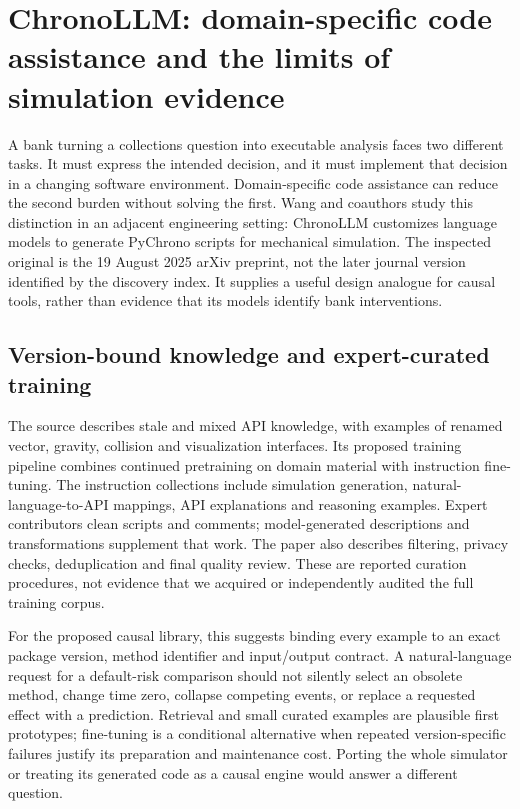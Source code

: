 \section{ChronoLLM: domain-specific code assistance and the limits of simulation evidence}
\label{sec:exec24-chronollm}
A bank turning a collections question into executable analysis faces two
different tasks. It must express the intended decision, and it must implement
that decision in a changing software environment. Domain-specific code
assistance can reduce the second burden without solving the first. Wang and
coauthors study this distinction in an adjacent engineering setting:
ChronoLLM customizes language models to generate PyChrono scripts for
mechanical simulation. The inspected original is the 19 August 2025 arXiv
preprint, not the later journal version identified by the discovery index.
It supplies a useful design analogue for causal tools, rather than evidence
that its models identify bank interventions.~\citep{exec24_chronollm_original}

\subsection{Version-bound knowledge and expert-curated training}
The source describes stale and mixed API knowledge, with examples of renamed
vector, gravity, collision and visualization interfaces. Its proposed training
pipeline combines continued pretraining on domain material with instruction
fine-tuning. The instruction collections include simulation generation,
natural-language-to-API mappings, API explanations and reasoning examples.
Expert contributors clean scripts and comments; model-generated descriptions
and transformations supplement that work. The paper also describes filtering,
privacy checks, deduplication and final quality review. These are reported
curation procedures, not evidence that we acquired or independently audited
the full training corpus.~\citep{exec24_chronollm_original}

For the proposed causal library, this suggests binding every example to an
exact package version, method identifier and input/output contract. A
natural-language request for a default-risk comparison should not silently
select an obsolete method, change time zero, collapse competing events, or
replace a requested effect with a prediction. Retrieval and small curated
examples are plausible first prototypes; fine-tuning is a conditional
alternative when repeated version-specific failures justify its preparation
and maintenance cost. Porting the whole simulator or treating its generated
code as a causal engine would answer a different question.

